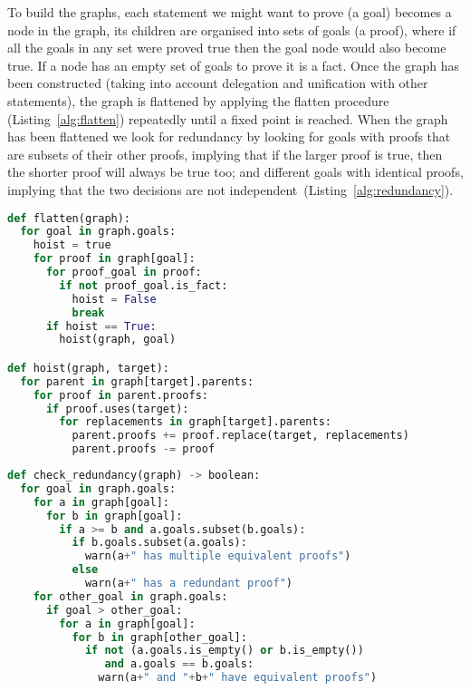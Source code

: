 \documentclass[a4paper]{scrartcl}
\begin{document}
To build the graphs, each statement we might want to prove (a goal) becomes a
node in the graph, its children are organised into sets of goals (a proof),
where if all the goals in any set were proved true then the goal node would also
become true. If a node has an empty set of goals to prove it is a fact. Once the
graph has been constructed (taking into account delegation and unification with
other statements), the graph is flattened by applying the flatten procedure
(Listing~\ref{alg:flatten}) repeatedly until a fixed point is reached. When the
graph has been flattened we look for redundancy by looking for goals with proofs
that are subsets of their other proofs, implying that if the larger proof is
true, then the shorter proof will always be true too; and different goals with
identical proofs, implying that the two decisions are not
independent~(Listing~\ref{alg:redundancy}).

\begin{lstlisting}[language=Python,float,caption={Procedure for flattening the redundancy graph.},label={alg:flatten}]
def flatten(graph):
  for goal in graph.goals:
    hoist = true
    for proof in graph[goal]:
      for proof_goal in proof:
        if not proof_goal.is_fact:
          hoist = False
          break
      if hoist == True:
        hoist(graph, goal)

def hoist(graph, target):
  for parent in graph[target].parents:
    for proof in parent.proofs:
      if proof.uses(target):
        for replacements in graph[target].parents:
          parent.proofs += proof.replace(target, replacements)
          parent.proofs -= proof
\end{lstlisting}

\begin{lstlisting}[language=Python,float,caption={Procedure to check for redundancy.},label={alg:redundancy}]
def check_redundancy(graph) -> boolean:
  for goal in graph.goals:
    for a in graph[goal]:
      for b in graph[goal]:
        if a >= b and a.goals.subset(b.goals):
          if b.goals.subset(a.goals):
            warn(a+" has multiple equivalent proofs")
          else
            warn(a+" has a redundant proof")
    for other_goal in graph.goals:
      if goal > other_goal:
        for a in graph[goal]:
          for b in graph[other_goal]:
            if not (a.goals.is_empty() or b.is_empty())
               and a.goals == b.goals:
              warn(a+" and "+b+" have equivalent proofs")
\end{lstlisting}
\end{document}
